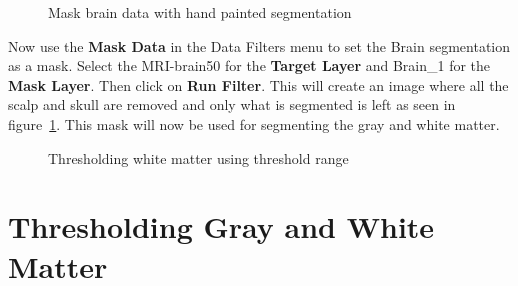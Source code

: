 \documentclass[fleqn,11pt,openany]{book}
\begin{document}
\begin{figure}
\caption{Mask brain data with hand painted segmentation}\label{fig:MaskDataBrain}
\end{figure}

Now use the {\bf Mask Data} in the Data Filters menu to set the  Brain segmentation as a mask. Select the MRI-brain50 for the {\bf Target Layer} and Brain\_1 for the {\bf Mask Layer}. Then click on {\bf Run Filter}. This will create an image where all the scalp and skull are removed and only what is segmented is left as seen in figure~\ref{fig:MaskDataBrain}. This mask will now be used for segmenting the gray and white matter.


\begin{figure}
\caption{Thresholding white matter using threshold range}\label{fig:ThresholdWhiteMatter}
\end{figure}

\section{Thresholding Gray and White Matter}
\end{document}
